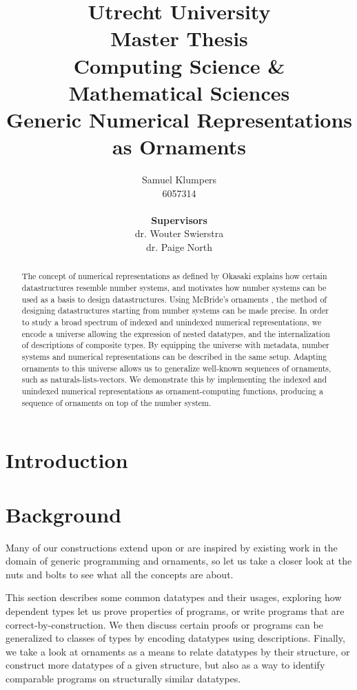 \documentclass[9pt, final]{article}
\title{\large Utrecht University \\ Master Thesis \\ Computing Science \& Mathematical Sciences \\ \Large Generic Numerical Representations as Ornaments}
\author{Samuel Klumpers\\6057314\\ \\ \textbf{Supervisors} \\ dr. Wouter Swierstra \\ dr. Paige North}
\theoremstyle{plain}
\theoremstyle{definition}
\begin{document}
\maketitle

\newpage
\begin{abstract}
The concept of numerical representations as defined by Okasaki \cite{purelyfunctional} explains how certain datastructures resemble number systems, and motivates how number systems can be used as a basis to design datastructures. Using McBride's ornaments \cite{algorn}, the method of designing datastructures starting from number systems can be made precise. In order to study a broad spectrum of indexed and unindexed numerical representations, we encode a universe allowing the expression of nested datatypes, and the internalization of descriptions of composite types. By equipping the universe with metadata, number systems and numerical representations can be described in the same setup. Adapting ornaments to this universe allows us to generalize well-known sequences of ornaments, such as naturals-lists-vectors. We demonstrate this by implementing the indexed and unindexed numerical representations as ornament-computing functions, producing a sequence of ornaments on top of the number system.
\end{abstract}


\newpage
\begin{small}
\tableofcontents
\end{small}
\newpage

\section{Introduction}\label{sec:introduction}



\section{Background}\label{part:background}
Many of our constructions extend upon or are inspired by existing work in the domain of generic programming and ornaments, so let us take a closer look at the nuts and bolts to see what all the concepts are about.

This section describes some common datatypes and their usages, exploring how dependent types let us prove properties of programs, or write programs that are correct-by-construction. We then discuss certain proofs or programs can be generalized to classes of types by encoding datatypes using descriptions. Finally, we take a look at ornaments as a means to relate datatypes by their structure, or construct more datatypes of a given structure, but also as a way to identify comparable programs on structurally similar datatypes.
\end{document}
